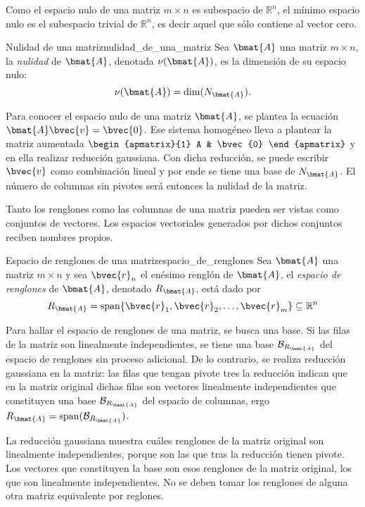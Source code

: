 \documentclass{fmbnotes}
\begin{document}
Como el espacio nulo de una matriz \(m \times n \) es subespacio de \(\mathbb{R}^{n}\), el mínimo espacio nulo es el subespacio trivial de \(\mathbb{R}^{n}\), es decir aquel que sólo contiene al vector cero.

\begin{definicion}{Nulidad de una matriz}{nulidad_de_una_matriz}
	Sea \(\bmat{A}\) una matriz \(m \times n \), la \emph{nulidad} de \(\bmat{A}\), denotada \(\nu(\bmat{A})\), es la dimensión de su espacio nulo: 
	\[\nu(\bmat{A})=\dim(N_{\bmat{A}}).\]
\end{definicion}

Para conocer el espacio nulo de una matriz \(\bmat{A}\), se plantea la ecuación \( \bmat{A}\bvec{v}=\bvec{0} \). Ese sistema homogéneo lleva a plantear la matriz aumentada \(\begin{apmatrix}{1}
	A & \bvec{0}
\end{apmatrix}\) y en ella realizar reducción gaussiana. Con dicha reducción, se puede escribir \(\bvec{v}\) como combinación lineal y por ende se tiene una base de \(N_{\bmat{A}}\). El número de columnas sin pivotes será entonces la nulidad de la matriz.

Tanto los renglones como las columnas de una matriz pueden ser vistas como conjuntos de vectores. Los espacios vectoriales generados por dichos conjuntos reciben nombres propios.

\begin{definicion}{Espacio de renglones de una matriz}{espacio_de_renglones}
	Sea \(\bmat{A}\) una matriz \(m \times n \) y sea \(\bvec{r}_n\) el enésimo renglón de \(\bmat{A}\), el \emph{espacio de renglones} de \(\bmat{A}\), denotado \(R_{\bmat{A}}\), está dado por
	\[R_{\bmat{A}}=\operatorname{span}\{\bvec{r}_1,\bvec{r}_2,\ldots,\bvec{r}_m\} \subseteq \mathbb{R}^{n}\]
\end{definicion}

Para hallar el espacio de renglones de una matriz, se busca una base. Si las filas de la matriz son linealmente independientes, se tiene una base \(\mathcal{B}_{R_{\bmat{A}}}\) del espacio de renglones sin proceso adicional. De lo contrario, se realiza reducción gaussiana en la matriz: las filas que tengan pivote tres la reducción indican que en la matriz original dichas filas  son vectores linealmente independientes que constituyen una base \(\mathcal{B}_{R_{\bmat{A}}}\) del espacio de columnas, ergo \(R_{\bmat{A}}=\operatorname{span}(\mathcal{B}_{R_{\bmat{A}}})\).

\begin{advertencia}
	La reducción gaussiana muestra cuáles renglones de la matriz original son linealmente independientes, porque son las que tras la reducción tienen pivote. Los vectores que constituyen la base son esos renglones de la matriz original, los que son linealmente independientes. No se deben tomar los renglones de alguna otra matriz equivalente por reglones.
\end{advertencia}
\end{document}
